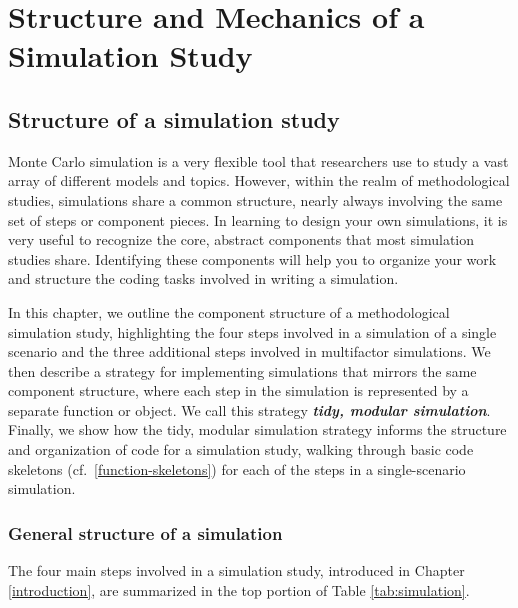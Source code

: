 \documentclass[
]{book}
\begin{document}
\part{Structure and Mechanics of a Simulation Study}\label{part-structure-and-mechanics-of-a-simulation-study}

\chapter{Structure of a simulation study}\label{structure-of-a-simulation-study}

Monte Carlo simulation is a very flexible tool that researchers use to study a vast array of different models and topics.
However, within the realm of methodological studies, simulations share a common structure, nearly always involving the same set of steps or component pieces.
In learning to design your own simulations, it is very useful to recognize the core, abstract components that most simulation studies share.
Identifying these components will help you to organize your work and structure the coding tasks involved in writing a simulation.

In this chapter, we outline the component structure of a methodological simulation study, highlighting the four steps involved in a simulation of a single scenario and the three additional steps involved in multifactor simulations.
We then describe a strategy for implementing simulations that mirrors the same component structure, where each step in the simulation is represented by a separate function or object.
We call this strategy \textbf{\emph{tidy, modular simulation}}.
Finally, we show how the tidy, modular simulation strategy informs the structure and organization of code for a simulation study, walking through basic code skeletons (cf.~\ref{function-skeletons}) for each of the steps in a single-scenario simulation.

\section{General structure of a simulation}\label{general-structure-of-a-simulation}

The four main steps involved in a simulation study, introduced in Chapter \ref{introduction}, are summarized in the top portion of Table \ref{tab:simulation}.
\end{document}

